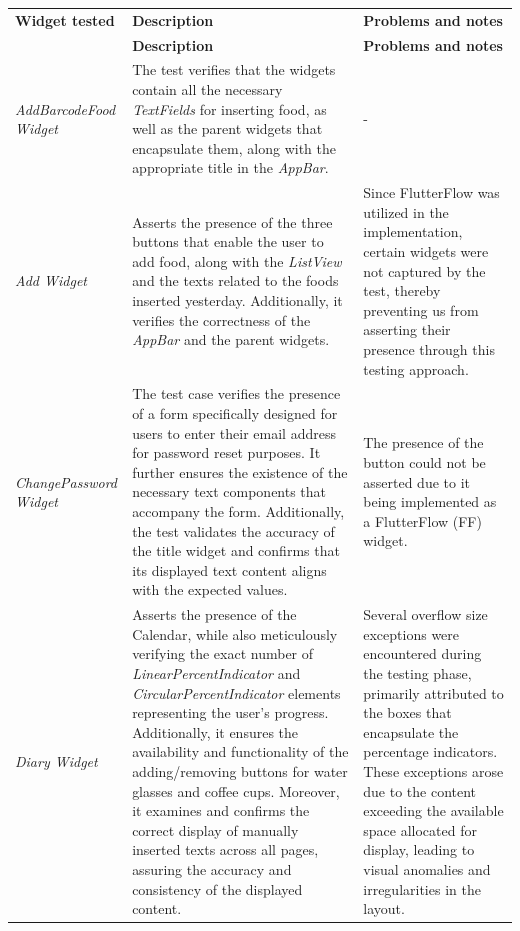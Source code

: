 \documentclass{Configuration_Files/PoliMi3i_thesis}
\begin{document}
\begin{longtable}{|m{3cm}|m{6cm}|m{5cm}|}
    \hline
     \multirow{2}{*}{\textbf{Widget tested}} & \multirow{2}{*}{\textbf{Description}} & \multirow{2}{*}{\textbf{Problems and notes}} \\[0.5ex]
        & \\[-1ex]
    \hline
    \endfirsthead
    \hline
    \centering
     \multirow{2}{*}{\textbf{Widget tested}} & \multirow{2}{*}{\textbf{Description}} & \multirow{2}{*}{\textbf{Problems and notes}} \\[0.5ex]
        & \\[-1ex]
    \hline
    \endhead
    \hline
    \endfoot
    \hline
    \endlastfoot 
    \textit{AddBarcodeFood Widget} & The test verifies that the widgets contain all the necessary \textit{TextFields} for inserting food, as well as the parent widgets that encapsulate them, along with the appropriate title in the \textit{AppBar}. & - \\
    \hline
    \textit{Add Widget} & Asserts the presence of the three buttons that enable the user to add food, along with the \textit{ListView} and the texts related to the foods inserted yesterday. Additionally, it verifies the correctness of the \textit{AppBar} and the parent widgets. & Since FlutterFlow was utilized in the implementation, certain widgets were not captured by the test, thereby preventing us from asserting their presence through this testing approach. \\
    \hline
    \textit{ChangePassword Widget} & The test case verifies the presence of a form specifically designed for users to enter their email address for password reset purposes. It further ensures the existence of the necessary text components that accompany the form. Additionally, the test validates the accuracy of the title widget and confirms that its displayed text content aligns with the expected values. & The presence of the button could not be asserted due to it being implemented as a FlutterFlow (FF) widget. \\
    \hline
    \textit{Diary Widget} & Asserts the presence of the Calendar, while also meticulously verifying the exact number of \textit{LinearPercentIndicator} and \textit{CircularPercentIndicator} elements representing the user's progress. Additionally, it ensures the availability and functionality of the adding/removing buttons for water glasses and coffee cups. Moreover, it examines and confirms the correct display of manually inserted texts across all pages, assuring the accuracy and consistency of the displayed content. & Several overflow size exceptions were encountered during the testing phase, primarily attributed to the boxes that encapsulate the percentage indicators. These exceptions arose due to the content exceeding the available space allocated for display, leading to visual anomalies and irregularities in the layout.  \\

\end{longtable}
\end{document}
